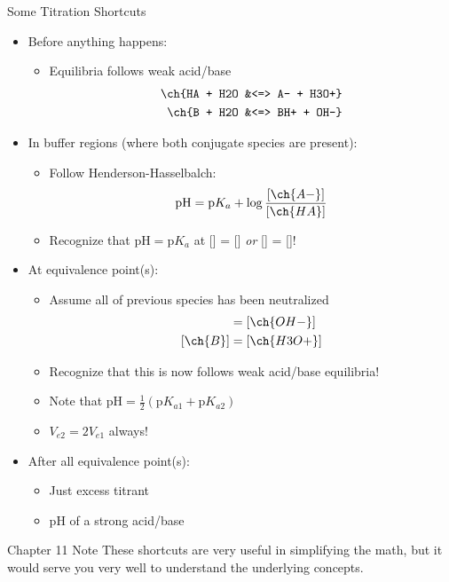 \documentclass[notes=show]{beamer}
\begin{document}
\begin{frame}[allowframebreaks]{Some Titration Shortcuts}
	\begin{itemize}
		\item Before anything happens:
			\begin{itemize}
				\item Equilibria follows weak acid/base
					\begin{align*}
						\ch{HA + H2O &<=> A- + H3O+} \\
						\ch{B + H2O &<=> BH+ + OH-}
					\end{align*}
			\end{itemize}
		\item In buffer regions (where both conjugate species are
			present):
			\begin{itemize}
				\item Follow Henderson-Hasselbalch:
					\begin{align*}
						\text{pH} = \text{p}K_a +
						\log\dfrac{[\ch{A-}]}{[\ch{HA}]}
					\end{align*}
				\item Recognize that $\text{pH} = \text{p}K_a$
					at [] = [] \textit{or}
					[] = []!
			\end{itemize}

			\framebreak


		\item At equivalence point(s):
			\begin{itemize}
				\item Assume all of previous species has been
					neutralized
					\begin{align*}
						[\ch{HA}] &= [\ch{OH-}] \\
						[\ch{B}] &= [\ch{H3O+}]
					\end{align*}
				\item Recognize that this is now follows
					\alert{weak acid/base equilibria}!
				\item Note that $\text{pH} =
					\frac{1}{2}(\text{p}K_{a1} +
					\text{p}K_{a2})$
				\item $V_{e2} = 2V_{e1}$ \alert{always}!
			\end{itemize}
		\item After all equivalence point(s):
			\begin{itemize}
				\item Just excess titrant
				\item pH of a strong acid/base
			\end{itemize}
	\end{itemize}

	\begin{block}{Chapter 11 Note}
		These shortcuts are very useful in simplifying the math, but it
		would serve you very well to understand the underlying concepts.
	\end{block}
\end{frame}
\end{document}
